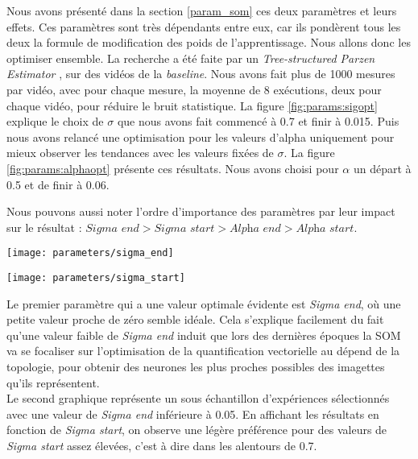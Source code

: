 	Nous avons présenté dans la section \ref{param_som} ces deux paramètres et leurs effets. Ces paramètres sont très dépendants entre eux, car ils pondèrent tous les deux la formule de modification des poids de l'apprentissage. Nous allons donc les optimiser ensemble. La recherche a été faite par un \textit{Tree-structured Parzen Estimator} \cite{bergstra2011algorithms}, sur des vidéos de la \textit{baseline}. Nous avons fait plus de 1000 mesures par vidéo, avec pour chaque mesure, la moyenne de 8 exécutions, deux pour chaque vidéo, pour réduire le bruit statistique. La figure \ref{fig:params:sigopt} explique le choix de $\sigma$ que nous avons fait commencé à 0.7 et finir à 0.015. Puis nous avons relancé une optimisation pour les valeurs d'alpha uniquement pour mieux observer les tendances avec les valeurs fixées de $\sigma$. La figure \ref{fig:params:alphaopt} présente ces résultats. Nous avons choisi pour $\alpha$ un départ à 0.5 et de finir à 0.06.

	Nous pouvons aussi noter l'ordre d'importance des paramètres par leur impact sur le résultat : $\textit{Sigma end} > \textit{Sigma start} > \textit{Alpha end} > \textit{Alpha start}$.

	\begin{figureth}
		\begin{subfigureth}{.75\textwidth}
			\texttt{[image: parameters/sigma\_end]}	
		\end{subfigureth}
		\begin{subfigureth}{.75\textwidth}
			\texttt{[image: parameters/sigma\_start]}	
		\end{subfigureth}
		\caption[Optimisation de $\sigma$]{Le premier paramètre qui a une valeur optimale évidente est \textit{Sigma end}, où une petite valeur proche de zéro semble idéale. Cela s'explique facilement du fait qu'une valeur faible de \textit{Sigma end} induit que lors des dernières époques la SOM va se focaliser sur l'optimisation de la quantification vectorielle au dépend de la topologie, pour obtenir des neurones les plus proches possibles des imagettes qu'ils représentent.\\
		
		Le second graphique représente un sous échantillon d'expériences sélectionnés avec une valeur de \textit{Sigma end} inférieure à 0.05. En affichant les résultats en fonction de \textit{Sigma start}, on observe une légère préférence pour des valeurs de \textit{Sigma start} assez élevées, c'est à dire dans les alentours de 0.7.}\label{fig:params:sigopt}
	\end{figureth}


